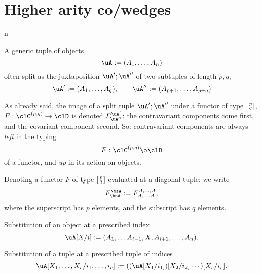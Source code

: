 \documentclass[11pt]{amsart}
\begin{document}
\section{Higher arity co/wedges}
\begin{enumtag}{n}
	\item\label{n_1} A generic tuple of objects,
	\[\uA := (\tpl{A})\]
	often split as the juxtaposition $\uA';\uA''$ of two subtuples of length $p,q$,
	\[ \uA':= (\tpl{A}[1][q]), \qquad \uA'' :=(\tpl{A}[p+1][p+q])\]
	\item \label{n_2}  As already said, the image of a split tuple $\uA';\uA''$ under a functor of type $\typepq{p}{q}$, $F : \pq{\clC} \to \clD$ is denoted $F^{\uA'}_{\uA''}$: the contravariant components come first, and the covariant component second. So: contravariant components are always \emph{left} in the typing \[F : \pq{\clC} \o \clD\]
	of a functor, and \emph{up} in its action on objects.
	\item \label{n_3}  Denoting a functor $F$ of type $\typepq{p}{q}$ evaluated at a diagonal tuple: we write
	\[F_{\bsA}^{\bsA} := F_{A,\ldots,A}^{A,\ldots,A},\]
	where the superscript has $p$ elements, and the subscript has $q$ elements.
	\item\label{n_4}  Substitution of an object at a prescribed index
	\[\uA[X/i] := (A_1,\dots A_{i-1},X,A_{i+1},\dots, A_n).\]
	\item\label{n_5} Substitution of a tuple at a prescribed tuple of indices
	\[\uA[X_1,\dots,X_r/i_1,\dots,i_r] := ((\uA[X_1/i_1])[X_2/i_2]\cdots)[X_r/i_r].\]
\end{enumtag}
\label{sec:org7927fcb}
\end{document}
